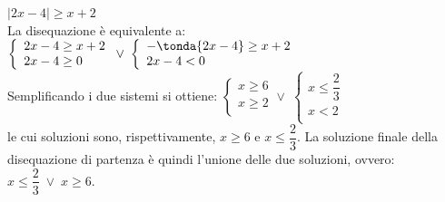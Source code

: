 \begin{esempio} $|2x-4|\geq x+2$\\[4pt] La disequazione è equivalente a:
\(\left\lbrace 
\begin{array}{l}
2x-4\geq x+2\\
2x-4\geq 0\\
\end{array}
\right.
\vee \;
\left\lbrace 
\begin{array}{l}
-\tonda{2x-4}\geq x+2\\
2x-4< 0\\
\end{array}
\right.\) \\[4pt]
Semplificando i due sistemi si ottiene:
\(\left\lbrace 
\begin{array}{l}
x\geq 6\\
x\geq 2\\
\end{array}
\right.
\vee \;
\left\lbrace 
\begin{array}{l}
x\leq \dfrac{2}{3}\\
x< 2\\
\end{array}
\right.\) \\[4pt]
le cui soluzioni sono, rispettivamente, \(x \geq 6\) e \(x\leq \dfrac{2}{3}\). La soluzione finale della disequazione di partenza
è quindi l'unione delle due soluzioni, ovvero: \(x\leq \dfrac{2}{3} \;\vee \;x \geq 6\).
\end{esempio}

